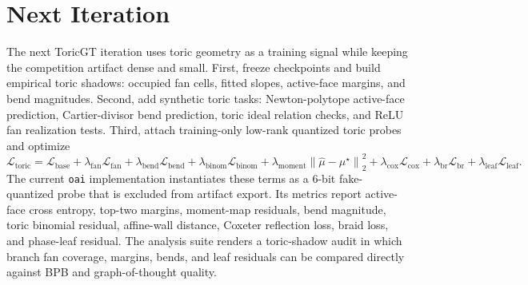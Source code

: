 \documentclass[10pt]{article}
\theoremstyle{definition}
\theoremstyle{plain}
\theoremstyle{remark}
\newcommand{\norm}[1]{\left\lVert #1\right\rVert}
\begin{document}
\section{Next Iteration}

The next ToricGT iteration uses toric geometry as a training signal while keeping the competition artifact dense and small.  First, freeze checkpoints and build empirical toric shadows: occupied fan cells, fitted slopes, active-face margins, and bend magnitudes.  Second, add synthetic toric tasks: Newton-polytope active-face prediction, Cartier-divisor bend prediction, toric ideal relation checks, and ReLU fan realization tests.  Third, attach training-only low-rank quantized toric probes and optimize
\begin{equation}
  \mathcal L_{\mathrm{toric}}
  =
  \mathcal L_{\mathrm{base}}
  +\lambda_{\mathrm{fan}}\mathcal L_{\mathrm{fan}}
  +\lambda_{\mathrm{bend}}\mathcal L_{\mathrm{bend}}
  +\lambda_{\mathrm{binom}}\mathcal L_{\mathrm{binom}}
  +\lambda_{\mathrm{moment}}\norm{\widehat\mu-\mu^\star}_2^2
  +\lambda_{\mathrm{cox}}\mathcal L_{\mathrm{cox}}
  +\lambda_{\mathrm{br}}\mathcal L_{\mathrm{br}}
  +\lambda_{\mathrm{leaf}}\mathcal L_{\mathrm{leaf}}.
\end{equation}
The current \texttt{oai} implementation instantiates these terms as a 6-bit fake-quantized probe that is excluded from artifact export.  Its metrics report active-face cross entropy, top-two margins, moment-map residuals, bend magnitude, toric binomial residual, affine-wall distance, Coxeter reflection loss, braid loss, and phase-leaf residual.  The analysis suite renders a toric-shadow audit in which branch fan coverage, margins, bends, and leaf residuals can be compared directly against BPB and graph-of-thought quality.
\end{document}
